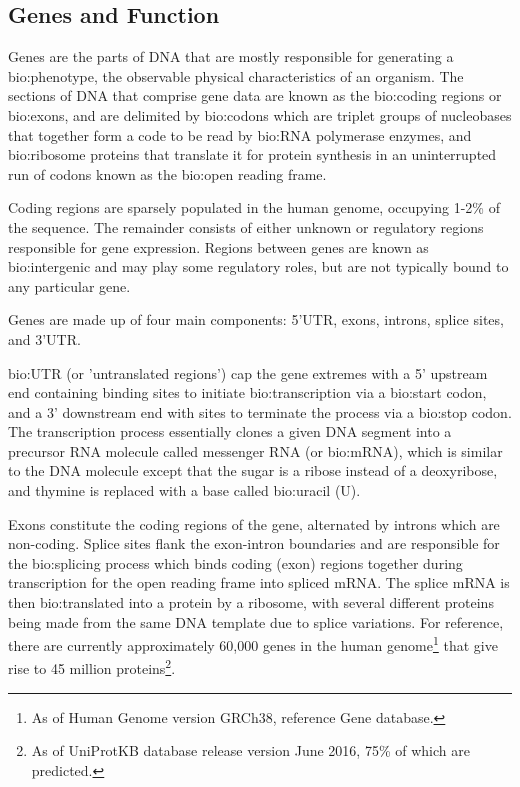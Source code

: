 \subsection{Genes and Function}

Genes are the parts of DNA that are mostly responsible for generating a \gls{bio:phenotype}, the observable physical characteristics of an organism. The sections of DNA that comprise gene data are known as the \gls{bio:coding} regions or \gls{bio:exons}, and are delimited by \gls{bio:codons} which are triplet groups of nucleobases that together form a code to be read by \gls{bio:RNA polymerase} enzymes, and \gls{bio:ribosome} proteins that translate it for protein synthesis in an uninterrupted run of codons known as the \gls{bio:open reading frame}.

Coding regions are sparsely populated in the human genome, occupying 1-2\% of the sequence. The remainder consists of either unknown or regulatory regions responsible for gene expression. Regions between genes are known as \gls{bio:intergenic} and may play some regulatory roles, but are not typically bound to any particular gene.

Genes are made up of four main components: 5'UTR, exons, introns, splice sites, and 3'UTR.

\gls{bio:UTR} (or 'untranslated regions') cap the gene extremes with a 5' upstream end containing binding sites to initiate \gls{bio:transcription} via a \gls{bio:start codon}, and a 3' downstream end with sites to terminate the process via a \gls{bio:stop codon}. The transcription process essentially clones a given DNA segment into a precursor RNA molecule called messenger RNA (or \gls{bio:mRNA}), which is similar to the DNA molecule except that the sugar is a ribose instead of a deoxyribose, and thymine is replaced with a base called \gls{bio:uracil} (U).

Exons constitute the coding regions of the gene, alternated by introns which are non-coding. Splice sites flank the exon-intron boundaries and are responsible for the \gls{bio:splicing} process which binds coding (exon) regions together during transcription for the open reading frame into spliced mRNA.  The splice mRNA is then \gls{bio:translated} into a protein by a ribosome, with several different proteins being made from the same DNA template due to splice variations. For reference, there are currently approximately 60,000 genes in the human genome\footnote{As of Human Genome version GRCh38, reference Gene database.}  that give rise to 45 million proteins\footnote{As of UniProtKB database release  version June 2016, 75\% of which are predicted.}.

